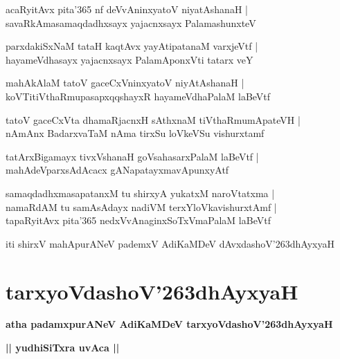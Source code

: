 \documentclass[twoside,12pt,openright]{book}
\def\S{\char'263}
\newcounter{shloka}[chapter]
\def\uvaca#1{\centerline{{\large\textbf{#1}}}}
\begin{document}
\begin{shloka}
acaRyitAvx pita\char'365 nf deVvAninxyatoV niyatAshanaH |\\
savaRkAmasamaqdadhxsayx yajacnxsayx PalamashunxteV 
\end{shloka}

\begin{shloka}
parxdakiSxNaM tataH kaqtAvx yayAtipatanaM varxjeVtf |\\
hayameVdhasayx yajacnxsayx PalamAponxVti tatarx veY
\end{shloka}

\begin{shloka}
mahAkAlaM tatoV gaceCxVninxyatoV niyAtAshanaH |\\
koVTitiVthaRmupasapxqqshayxR hayameVdhaPalaM laBeVtf
\end{shloka}

\begin{shloka}
tatoV gaceCxVta dhamaRjacnxH sAthxnaM tiVthaRmumApateVH |\\
nAmAnx BadarxvaTaM nAma tirxSu loVkeVSu vishurxtamf 
\end{shloka}

\begin{shloka}
tatArxBigamayx tivxVshanaH goVsahasarxPalaM laBeVtf |\\
mahAdeVparxsAdAcacx gANapatayxmavApunxyAtf
\end{shloka}

\begin{shloka}
samaqdadhxmasapatanxM tu shirxyA yukatxM naroVtatxma |\\
namaRdAM tu samAsAdayx nadiVM terxYloVkavishurxtAmf |\\
tapaRyitAvx pita\char'365 nedxVvAnaginxSoTxVmaPalaM laBeVtf
\end{shloka}

\begin{center}
iti shirxV mahApurANeV pademxV AdiKaMDeV dAvxdashoV\S dhAyxyaH
\end{center}

\chapter{tarxyoVdashoV\S dhAyxyaH}

\begin{center}
{\LARGE\bfseries atha padamxpurANeV AdiKaMDeV tarxyoVdashoV\S dhAyxyaH}
\end{center}

\uvaca{|| yudhiSiTxra uvAca ||}
\end{document}
